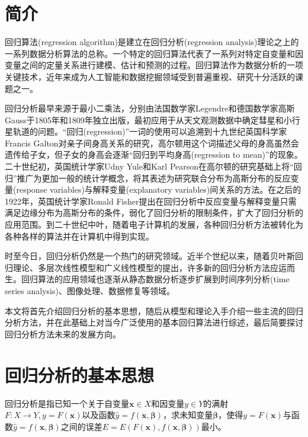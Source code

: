 \documentclass[a4paper]{ctexart}
\begin{document}
\begin{spacing}{1.3}
	\section{简介}
	回归算法(regression algorithm)是建立在回归分析(regression analysis)理论之上的一系列数据分析算法的总称。一个特定的回归算法代表了一系列对特定自变量和因变量之间的定量关系进行建模、估计和预测的过程。回归算法作为数据分析的一项关键技术，近年来成为人工智能和数据挖掘领域受到普遍重视、研究十分活跃的课题之一。
	
	回归分析最早来源于最小二乘法，分别由法国数学家Legendre和德国数学家高斯Gauss于1805年\cite{RN1}和1809年\cite{RN2}独立出版，最初应用于从天文观测数据中确定彗星和小行星轨道的问题。“回归(regression)”一词的使用可以追溯到十九世纪英国科学家Francis Galton对亲子间身高关系的研究，高尔顿用这个词描述父母的身高虽然会遗传给子女，但子女的身高会逐渐“回归到平均身高(regression to mean)”的现象\cite{RN3}。二十世纪初，英国统计学家Udny Yule和Karl Pearson在高尔顿的研究基础上将“回归”推广为更加一般的统计学概念，将其表述为研究联合分布为高斯分布的反应变量(response variables)与解释变量(explanatory variables)间关系的方法\cite{RN69}\cite{RN70}。在之后的1922年，英国统计学家Ronald Fisher提出在回归分析中反应变量与解释变量只需满足边缘分布为高斯分布的条件，弱化了回归分析的限制条件，扩大了回归分析的应用范围\cite{RN72}。到二十世纪中叶，随着电子计算机的发展，各种回归分析方法被转化为各种各样的算法并在计算机中得到实现。
	
	时至今日，回归分析仍然是一个热门的研究领域。近半个世纪以来，随着贝叶斯回归理论\cite{RN73}\cite{RN74}、多层次线性模型\cite{RN85}和广义线性模型\cite{RN91}的提出，许多新的回归分析方法应运而生。回归算法的应用领域也逐渐从静态数据分析逐步扩展到时间序列分析(time series analysis)、图像处理、数据修复等领域。
	
	本文将首先介绍回归分析的基本思想，随后从模型和理论入手介绍一些主流的回归分析方法，并在此基础上对当今广泛使用的基本回归算法进行综述，最后简要探讨回归分析方法未来的发展方向。
	\section{回归分析的基本思想}
	回归分析是指已知一个关于自变量$\bm{x}\in X$和因变量$y\in Y$的满射$F:X\rightarrow Y,y=F(\bm{x})$以及函数$\hat{y}=f(\bm{x},\bm{\beta})$，求未知变量$\bm{\beta}$，使得$y=F(\bm{x})$与函数$\hat{y}=f(\bm{x},\bm{\beta})$之间的误差$E=E(F(\bm{x}),f(\bm{x},\bm{\beta}))$最小。
	

\end{spacing}
\end{document}
